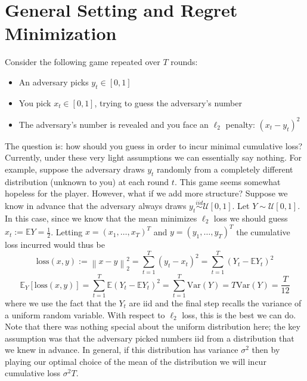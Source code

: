 \documentclass[12pt]{article}
\newcommand*{\norm}[1]{\left\lVert#1\right\rVert}
\newcommand{\E}{\mathbb{E}}
\newcommand{\Var}{\mathrm{Var}}
\begin{document}
\section{General Setting and Regret Minimization}
Consider the following game repeated over $T$ rounds: 
\begin{itemize}
\item An adversary picks $y_t \in [0, 1]$
\item You pick $x_t \in [0, 1]$, trying to guess the adversary's number
\item The adversary's number is revealed and you face an $\ell_2$ penalty: $(x_t - y_t)^2$
\end{itemize}
The question is: how should you guess in order to incur minimal cumulative loss? Currently, under these very light assumptions we can essentially say nothing. For example, suppose the adversary draws 
$y_t$ randomly from a completely different distribution (unknown to you) at each round $t$. This game seems somewhat hopeless for the player. However, what if we add more structure? Suppose we know 
in advance that the adversary always draws $y_t \overset{iid}{\sim} \mathcal{U}[0, 1]$. Let $Y \sim \mathcal{U}[0, 1]. $In this case, since we know that the mean minimizes $\ell_2$ loss we should guess 
$x_t := \E Y= \frac{1}{2}$. Letting $x = (x_1, \dots, x_T)^T$ and $y = (y_1, \dots, y_T)^T$ the cumulative loss incurred would thus be
\[\text{loss}(x, y) := \norm{x - y}_2^2 = \sum_{t = 1}^{T} (y_t - x_t)^2 = \sum_{t = 1}^{T} (Y_t - \E Y_t)^2 \]
\[\E_Y[\text{loss}(x, y)] =  \sum_{t = 1}^{T} \E(Y_t - \E Y_t)^2 = \sum_{t = 1}^{T} \Var(Y) = T\Var(Y) = \frac{T}{12}\]
where we use the fact that the $Y_t$ are iid and the final step recalls the variance of a uniform random variable. With respect to $\ell_2$ loss, this is the best we can do. Note that there was nothing special 
about the uniform distribution here; the key assumption was that the adversary picked numbers iid from a distribution that we knew in advance. In general, if this distribution has variance $\sigma^2$ then 
by playing our optimal choice of the mean of the distribution we will incur cumulative loss $\sigma^2 T$. 
\end{document}
